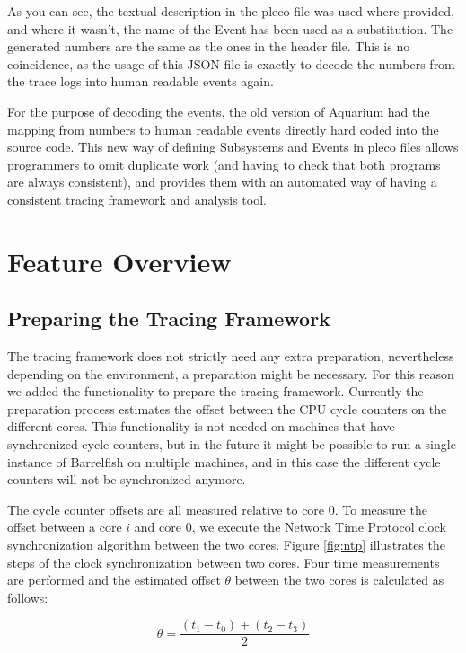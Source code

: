 \documentclass[a4paper,11pt,twoside]{report}
\begin{document}
As you can see, the textual description in the pleco file was used where
provided, and where it wasn't, the name of the Event has been used as a
substitution. The generated numbers are the same as the ones in the header file.
This is no coincidence, as the usage of this JSON file is exactly to decode the
numbers from the trace logs into human readable events again.

For the purpose of decoding the events, the old version of Aquarium had the
mapping from numbers to human readable events directly hard coded into the
source code. This new way of defining Subsystems and Events in pleco files
allows programmers to omit duplicate work (and having to check that both programs
are always consistent), and provides them with an automated way of having a
consistent tracing framework and analysis tool.

\section{Feature Overview}
\subsection{Preparing the Tracing Framework\label{sec:preparing}}

The tracing framework does not strictly need any extra preparation, nevertheless
depending on the environment, a preparation might be necessary. For this reason
we added the functionality to prepare the tracing framework. Currently the
preparation process estimates the offset between the CPU cycle counters on the
different cores. This functionality is not needed on machines that have
synchronized cycle counters, but in the future it might be possible to run a
single instance of Barrelfish on multiple machines, and in this case the
different cycle counters will not be synchronized anymore.

The cycle counter offsets are all measured relative to core $0$. To measure the
offset between a core $i$ and core $0$, we execute the Network Time Protocol
clock synchronization algorithm 
between the two cores. Figure \ref{fig:ntp} illustrates the steps of the clock
synchronization between two cores. Four time measurements are performed and the
estimated offset $\theta$ between the two cores is calculated as follows:

\begin{equation}
	\theta =  \frac{(t_1-t_0)+(t_2-t_3)}{2}
\end{equation}
\end{document}

